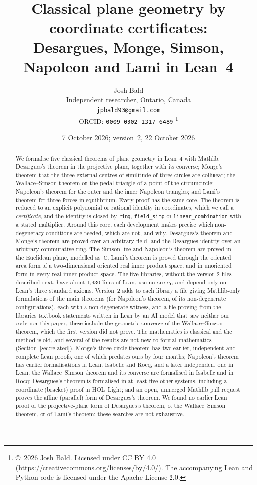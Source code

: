 \documentclass[11pt]{article}
\title{Classical plane geometry by coordinate certificates:\\
Desargues, Monge, Simson, Napoleon and Lami in Lean~4}
\author{Josh Bald\\ \small Independent researcher, Ontario, Canada\\ \small\texttt{jpbald93@gmail.com}\\
\small ORCID: \texttt{0009-0002-1317-6489}
\thanks{\copyright~2026 Josh Bald. Licensed under CC BY 4.0 (\url{https://creativecommons.org/licenses/by/4.0/}). The accompanying Lean and Python code is licensed under the Apache License 2.0.}}
\date{7 October 2026; version~2, 22 October 2026}
\theoremstyle{definition}
\theoremstyle{remark}
\newcommand{\lean}[1]{\texttt{#1}}
\newcommand{\CC}{\mathbb{C}}
\begin{document}
\maketitle

\begin{abstract}
We formalise five classical theorems of plane geometry in Lean~4 with Mathlib: Desargues's
theorem in the projective plane, together with its converse; Monge's theorem that the three
external centres of similitude of three circles are collinear; the Wallace--Simson theorem on the
pedal triangle of a point of the circumcircle; Napoleon's theorem for the outer and the inner
Napoleon triangles; and Lami's theorem for three forces in equilibrium. Every proof has the same
core. The theorem is reduced to an explicit polynomial or rational identity in coordinates, which
we call a \emph{certificate}, and the identity is closed by \lean{ring}, \lean{field\_simp} or
\lean{linear\_combination} with a stated multiplier. Around this core, each development makes
precise which non-degeneracy conditions are needed, which are not, and why. Desargues's theorem and
Monge's theorem are proved over an arbitrary field, and the Desargues identity over an arbitrary
commutative ring. The Simson line and Napoleon's theorem are proved in the Euclidean plane,
modelled as~$\CC$. Lami's theorem is proved through the oriented area form of a two-dimensional
oriented real inner product space, and in unoriented form in every real inner product space. The
five libraries, without the version-2 files described next, have about 1{,}430 lines of Lean, use no \lean{sorry}, and depend only on Lean's
three standard axioms. Version~2 adds to each library a file giving Mathlib-only formulations of the main theorems
(for Napoleon's theorem, of its non-degenerate configurations), each with a non-degenerate witness, and a file proving from the libraries
textbook statements written in Lean by an AI model that saw neither our code nor this paper; these
include the geometric converse of the Wallace--Simson theorem, which the first version did not prove. The mathematics is classical and the method is old, and several of the
results are not new to formal mathematics (Section~\ref{sec:related}). Monge's three-circle
theorem has two earlier, independent and complete Lean proofs, one of which predates ours by four
months; Napoleon's theorem has
earlier formalisations in Lean, Isabelle and Rocq, and a later independent one in Lean; the Wallace--Simson theorem and its converse
are formalised in Isabelle and in Rocq; Desargues's theorem is formalised in at least five other
systems, including a coordinate (bracket) proof in HOL~Light; and an open, unmerged Mathlib pull
request proves the affine (parallel) form of Desargues's theorem. We found no earlier Lean proof
of the projective-plane form of Desargues's theorem, of the Wallace--Simson theorem, or of Lami's
theorem; these searches are not exhaustive.
\end{abstract}
\end{document}
